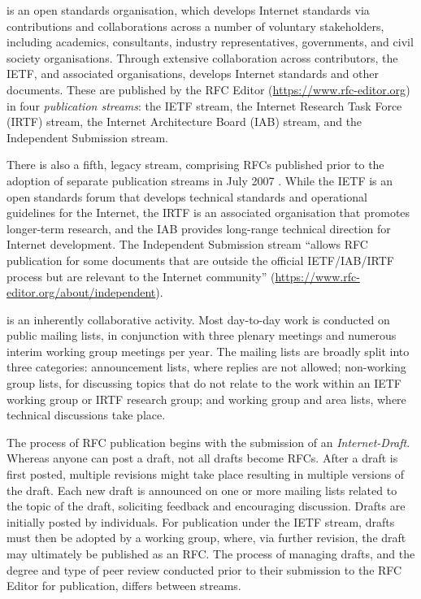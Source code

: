 \documentclass[twocolumn,10pt]{article}
\newcommand{\pb}[1]{\vspace{0.75ex}\noindent{\textbf{#1}}}
\begin{document}

\pb{The IETF} is an open standards organisation, which develops
Internet standards via contributions and collaborations across a number of
voluntary stakeholders, including academics, consultants, industry
representatives, governments, and civil society organisations.  Through
extensive collaboration across contributors, the IETF, and associated
organisations, develops Internet standards and other documents. These are
published by the RFC Editor (\url{https://www.rfc-editor.org}) in four
\emph{publication streams}: the IETF stream, the Internet Research Task
Force (IRTF) stream, the Internet Architecture Board (IAB) stream, and the
Independent Submission stream.

There is also a fifth, legacy stream, comprising RFCs published prior to
the adoption of separate publication streams in July 2007 \cite{rfc4844}.
While the IETF is an open standards forum that develops technical standards
and operational guidelines for the Internet, the IRTF is an associated
organisation that promotes longer-term research, and the IAB provides
long-range technical direction for Internet development. The Independent
Submission stream ``allows RFC publication for some documents that are
outside the official IETF/IAB/IRTF process but are relevant to the Internet
community'' (\url{https://www.rfc-editor.org/about/independent}).

\pb{The standards development process} is an inherently collaborative
activity.  Most day-to-day work is conducted on public mailing lists, in
conjunction with three plenary meetings and numerous interim working group
meetings per year. 
The mailing lists are broadly split into three categories: announcement
lists, where replies are not allowed; non-working group lists, for
discussing topics that do not relate to the work within an IETF working
group or IRTF research group; and working group and area lists, where
technical discussions take place.

The process of RFC publication begins with the submission of an
\emph{Internet-Draft}. Whereas anyone can post a draft, not all drafts
become RFCs. After a draft is first posted, multiple revisions might take
place resulting in multiple versions of the draft. Each new draft is
announced on one or more mailing lists related to the topic of the draft,
soliciting feedback and encouraging discussion. Drafts are initially posted
by individuals. For publication under the IETF stream, drafts must then be
adopted by a working group, where, via further revision, the draft may
ultimately be published as an RFC. The process of managing drafts, and the
degree and type of peer review conducted prior to their submission to the
RFC Editor for publication, differs between streams.
\end{document}
